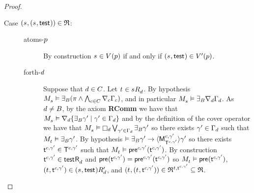 \begin{proof}
\begin{description}
    \item[{Case $(\kStateS, (\kStateS, \aStateTest)) \in \refinement$:}]\hfill
        \begin{description}
            \item[atoms-$\atomP$]
                By construction $\kStateS \in \kValuation(\atomP)$ if and only if $(\kStateS, \aStateTest) \in \kValuationP(\atomP)$.
            \item[forth-$\agentD$]
                Suppose that $\agentD \in \agentsC$.
                Let $\kStateT \in \kSuccessorsD{\kStateS}$.
                By hypothesis $\kPModel{\kStateS} \entails \someactsBs (\pi \land \bigwedge_{\agentC \in \agentsC} \coversC \Gamma_\agentC)$, and in particular $\kPModel{\kStateS} \entails \someactsBs \coversD \Gamma_\agentD$.
                As $\agentD \neq \agentsB$, by the \axiomRamlK{} axiom {\bf RComm} we have that $\kPModel{\kStateS} \entails \coversD \{\someactsBs \gamma' \mid \gamma' \in \Gamma_\agentD\}$ and by the definition of the cover operator we have that $\kPModel{\kStateS} \entails \necessaryD \bigvee_{\gamma' \in \Gamma_\agentD} \someactsBs \gamma'$ so there exists $\gamma' \in \Gamma_\agentD$ such that $\kPModel{\kStateT} \entails \someactsBs \gamma'$.
                By hypothesis $\entails \someactsBs \gamma' \implies \actionE{\aPModel[\agentC, \gamma']{\aStatesT[\agentC, \gamma']}} \gamma'$ so there exists $\aStateT[\agentC, \gamma'] \in \aStatesT[\agentC, \gamma']$ such that $\kPModel{\kStateT} \entails \aPrecondition[\agentC, \gamma'](\aStateT[\agentC, \gamma'])$.
                By construction $\aStateT[\agentC, \gamma'] \in \aSuccessorsD{\aStateTest}$ and $\aPrecondition(\aStateT[\agentC, \gamma']) = \aPrecondition[\agentC, \gamma'](\aStateT[\agentC, \gamma'])$ so $\kPModel{\kStateT} \entails \aPrecondition(\aStateT[\agentC, \gamma'])$, $(\kStateT, \aStateT[\agentC, \gamma']) \in \kSuccessorsPD{(\kStateS, \aStateTest)}$, and $(\kStateT, (\kStateT, \aStateT[\agentC, \gamma'])) \in \refinement^{\kStateT, \aStateT[\agentC, \gamma']} \subseteq \refinement$.


\end{description}
\end{description}
\end{proof}

